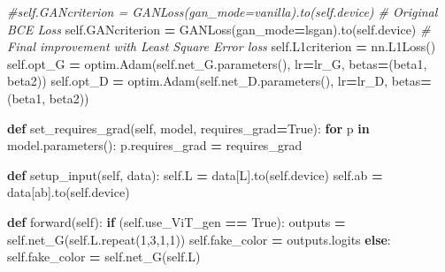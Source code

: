 \documentclass[
]{article}
\newenvironment{Shaded}{\begin{snugshade}}{\end{snugshade}}
\newcommand{\CommentTok}[1]{\textcolor[rgb]{0.56,0.35,0.01}{\textit{#1}}}
\newcommand{\ControlFlowTok}[1]{\textcolor[rgb]{0.13,0.29,0.53}{\textbf{#1}}}
\newcommand{\DecValTok}[1]{\textcolor[rgb]{0.00,0.00,0.81}{#1}}
\newcommand{\KeywordTok}[1]{\textcolor[rgb]{0.13,0.29,0.53}{\textbf{#1}}}
\newcommand{\NormalTok}[1]{#1}
\newcommand{\OperatorTok}[1]{\textcolor[rgb]{0.81,0.36,0.00}{\textbf{#1}}}
\newcommand{\StringTok}[1]{\textcolor[rgb]{0.31,0.60,0.02}{#1}}
\newcommand{\VariableTok}[1]{\textcolor[rgb]{0.00,0.00,0.00}{#1}}
\begin{document}
\begin{Shaded}
\begin{Highlighting}[]
        \CommentTok{\#self.GANcriterion = GANLoss(gan\_mode=\textquotesingle{}vanilla\textquotesingle{}).to(self.device)  \# Original BCE Loss}
        \VariableTok{self}\NormalTok{.GANcriterion }\OperatorTok{=}\NormalTok{ GANLoss(gan\_mode}\OperatorTok{=}\StringTok{\textquotesingle{}lsgan\textquotesingle{}}\NormalTok{).to(}\VariableTok{self}\NormalTok{.device)  }\CommentTok{\# Final improvement with Least Square Error loss}
        \VariableTok{self}\NormalTok{.L1criterion }\OperatorTok{=}\NormalTok{ nn.L1Loss()}
        \VariableTok{self}\NormalTok{.opt\_G }\OperatorTok{=}\NormalTok{ optim.Adam(}\VariableTok{self}\NormalTok{.net\_G.parameters(), lr}\OperatorTok{=}\NormalTok{lr\_G, betas}\OperatorTok{=}\NormalTok{(beta1, beta2))}
        \VariableTok{self}\NormalTok{.opt\_D }\OperatorTok{=}\NormalTok{ optim.Adam(}\VariableTok{self}\NormalTok{.net\_D.parameters(), lr}\OperatorTok{=}\NormalTok{lr\_D, betas}\OperatorTok{=}\NormalTok{(beta1, beta2))}
    
    \KeywordTok{def}\NormalTok{ set\_requires\_grad(}\VariableTok{self}\NormalTok{, model, requires\_grad}\OperatorTok{=}\VariableTok{True}\NormalTok{):}
        \ControlFlowTok{for}\NormalTok{ p }\KeywordTok{in}\NormalTok{ model.parameters():}
\NormalTok{            p.requires\_grad }\OperatorTok{=}\NormalTok{ requires\_grad}
        
    \KeywordTok{def}\NormalTok{ setup\_input(}\VariableTok{self}\NormalTok{, data):}
        \VariableTok{self}\NormalTok{.L }\OperatorTok{=}\NormalTok{ data[}\StringTok{\textquotesingle{}L\textquotesingle{}}\NormalTok{].to(}\VariableTok{self}\NormalTok{.device)}
        \VariableTok{self}\NormalTok{.ab }\OperatorTok{=}\NormalTok{ data[}\StringTok{\textquotesingle{}ab\textquotesingle{}}\NormalTok{].to(}\VariableTok{self}\NormalTok{.device)}
        
    \KeywordTok{def}\NormalTok{ forward(}\VariableTok{self}\NormalTok{):}
        \ControlFlowTok{if}\NormalTok{ (}\VariableTok{self}\NormalTok{.use\_ViT\_gen }\OperatorTok{==} \VariableTok{True}\NormalTok{):}
\NormalTok{            outputs }\OperatorTok{=} \VariableTok{self}\NormalTok{.net\_G(}\VariableTok{self}\NormalTok{.L.repeat(}\DecValTok{1}\NormalTok{,}\DecValTok{3}\NormalTok{,}\DecValTok{1}\NormalTok{,}\DecValTok{1}\NormalTok{))}
            \VariableTok{self}\NormalTok{.fake\_color }\OperatorTok{=}\NormalTok{ outputs.logits}
        \ControlFlowTok{else}\NormalTok{:}
            \VariableTok{self}\NormalTok{.fake\_color }\OperatorTok{=} \VariableTok{self}\NormalTok{.net\_G(}\VariableTok{self}\NormalTok{.L)}
    

\end{Highlighting}
\end{Shaded}
\end{document}
